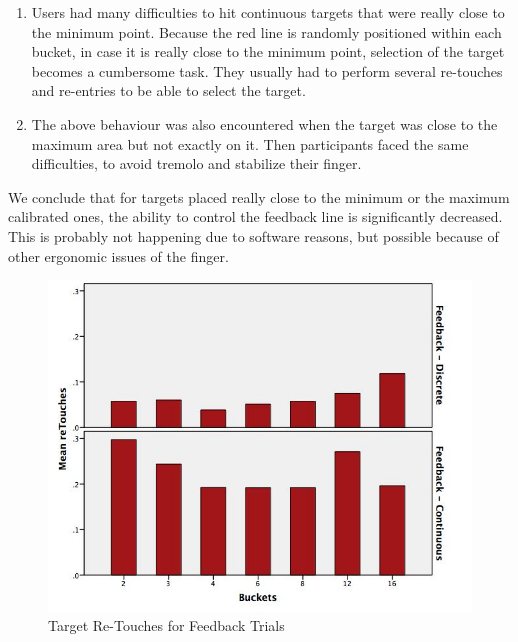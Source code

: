 \begin{enumerate}
     \item Users had many difficulties to hit continuous targets that were really close to the minimum point. Because the red line is randomly positioned within each bucket, in case it is really close to the minimum point, selection of the target becomes a cumbersome task. They usually had to perform several re-touches and re-entries to be able to select the target.  

     \item The above behaviour was also encountered when the target was close to the maximum area but not exactly on it. Then participants faced the same difficulties, to avoid tremolo and stabilize their finger. 
 \end{enumerate} 

 We conclude that for targets placed really close to the minimum or the maximum calibrated ones, the ability to control the feedback line is significantly decreased. This is probably not happening due to software reasons, but possible because of other ergonomic issues of the finger. 

\begin{figure}[h]
\centering
\includegraphics[scale=0.4]{figures/meanRetouches}
\caption{Target Re-Touches for Feedback Trials}
\label{fig:meanRetouches}
\end{figure}




